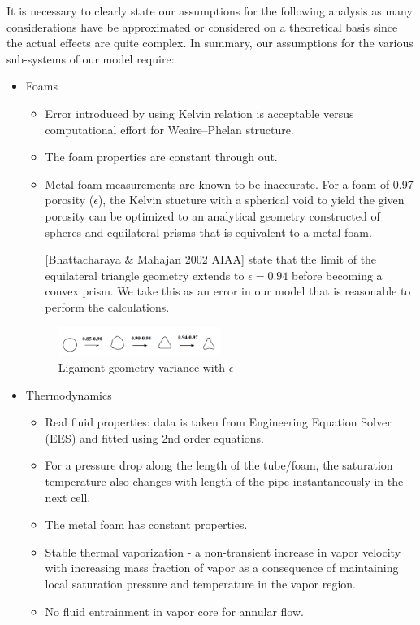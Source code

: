 \documentclass[compileTAMUreport.tex]{subfiles}
\begin{document}
It is necessary to clearly state our assumptions for the following analysis as many considerations have be approximated or considered on a theoretical basis since the actual effects are quite complex. 
In summary, our assumptions for the various sub-systems of our model require:
\begin{itemize} %
	\item Foams
		\begin{itemize}
			\item 	Error introduced by using Kelvin relation is acceptable versus computational effort for Weaire–Phelan structure. \cite{Kusner1996}
			\item The foam properties are constant through out.
			\item	Metal foam measurements are known to be inaccurate. 
			For a foam of 0.97 porosity ($\epsilon$), the Kelvin stucture with a spherical void to yield the given porosity can be optimized to an analytical geometry constructed of spheres and equilateral prisms that is equivalent to a metal foam.
			 
			[Bhattacharaya 		\& Mahajan 2002 AIAA] state that the limit of the equilateral triangle geometry extends to $\epsilon = 0.94$ before becoming a convex prism. 
			We take this as an error in our model that is reasonable to perform the calculations.
		\end{itemize}
		
\begin{figure}[H]
  \centering
    \includegraphics[width=0.5\textwidth]{./figure/porosityVariance}
  \caption{Ligament geometry variance with $\epsilon$}
\end{figure}

	\item Thermodynamics
		\begin{itemize}
			\item 	Real fluid properties: data is taken from Engineering Equation Solver (EES) and fitted using 2nd order equations. 
			\item 	For a pressure drop along the length of the tube/foam, the saturation temperature also changes with length of the pipe instantaneously in the next cell.
			\item The metal foam has constant properties.
			\item 	Stable thermal vaporization - a non-transient increase in vapor velocity with increasing mass fraction of vapor as a consequence of maintaining local saturation pressure and temperature in the vapor region.
		\item 	No fluid entrainment in vapor core for annular flow.
		\end{itemize}


\end{itemize}
\end{document}
